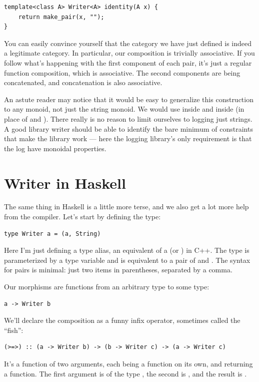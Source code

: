 \begin{Verbatim}
template<class A> Writer<A> identity(A x) {
    return make_pair(x, "");
}
\end{Verbatim}
You can easily convince yourself that the category we have just defined
is indeed a legitimate category. In particular, our composition is
trivially associative. If you follow what's happening with the first
component of each pair, it's just a regular function composition, which
is associative. The second components are being concatenated, and
concatenation is also associative.

An astute reader may notice that it would be easy to generalize this
construction to any monoid, not just the string monoid. We would use
 inside  and  inside
 (in place of \code{+} and ). There really
is no reason to limit ourselves to logging just strings. A good library
writer should be able to identify the bare minimum of constraints that
make the library work --- here the logging library's only requirement is
that the log have monoidal properties.

\section{Writer in Haskell}\label{writer-in-haskell}

The same thing in Haskell is a little more terse, and we also get a lot
more help from the compiler. Let's start by defining the 
type:

\begin{Verbatim}
type Writer a = (a, String)
\end{Verbatim}
Here I'm just defining a type alias, an equivalent of a 
(or ) in C++. The type  is parameterized by
a type variable  and is equivalent to a pair of  and
. The syntax for pairs is minimal: just two items in
parentheses, separated by a comma.

Our morphisms are functions from an arbitrary type to some
 type:

\begin{Verbatim}
a -> Writer b
\end{Verbatim}
We'll declare the composition as a funny infix operator, sometimes
called the ``fish'':

\begin{Verbatim}
(>=>) :: (a -> Writer b) -> (b -> Writer c) -> (a -> Writer c)
\end{Verbatim}
It's a function of two arguments, each being a function on its own, and
returning a function. The first argument is of the type
, the second is
, and the result is
.

